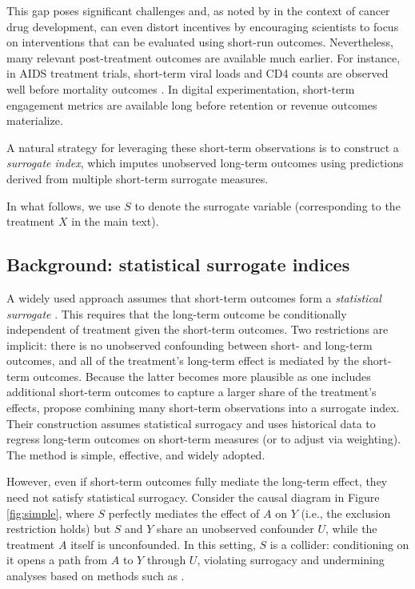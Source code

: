 \documentclass[11pt]{article}
\theoremstyle{plain}
\theoremstyle{definition}
\theoremstyle{remark}
\theoremstyle{definition}
\begin{document}
This gap poses significant challenges and, as noted by \citet{budish2015firms} in the context of cancer drug development, can even distort incentives by encouraging scientists to focus on interventions that can be evaluated using short-run outcomes. Nevertheless, many relevant post-treatment outcomes are available much earlier. For instance, in AIDS treatment trials, short-term viral loads and CD4 counts are observed well before mortality outcomes \citep{fleming1994surrogate}. In digital experimentation, short-term engagement metrics are available long before retention or revenue outcomes materialize.

A natural strategy for leveraging these short-term observations is to construct a \emph{surrogate index}, which imputes unobserved long-term outcomes using predictions derived from multiple short-term surrogate measures.

In what follows, we use $S$ to denote the surrogate variable (corresponding to the treatment $X$ in the main text).


\subsection{Background: statistical surrogate indices}

A widely used approach assumes that short-term outcomes form a \emph{statistical surrogate} \citep{prentice1989surrogate}. This requires that the long-term outcome be conditionally independent of treatment given the short-term outcomes. Two restrictions are implicit: there is no unobserved confounding between short- and long-term outcomes, and all of the treatment’s long-term effect is mediated by the short-term outcomes. Because the latter becomes more plausible as one includes additional short-term outcomes to capture a larger share of the treatment’s effects, \citet{athey2019surrogate} propose combining many short-term observations into a surrogate index. Their construction assumes statistical surrogacy and uses historical data to regress long-term outcomes on short-term measures (or to adjust via weighting). The method is simple, effective, and widely adopted.

However, even if short-term outcomes fully mediate the long-term effect, they need not satisfy statistical surrogacy. Consider the causal diagram in Figure \ref{fig:simple}, where $S$ perfectly mediates the effect of $A$ on $Y$ (i.e., the exclusion restriction holds) but $S$ and $Y$ share an unobserved confounder $U$, while the treatment $A$ itself is unconfounded. In this setting, $S$ is a collider: conditioning on it opens a path from $A$ to $Y$ through $U$, violating surrogacy and undermining analyses based on methods such as \citet{athey2019surrogate}.
\end{document}
